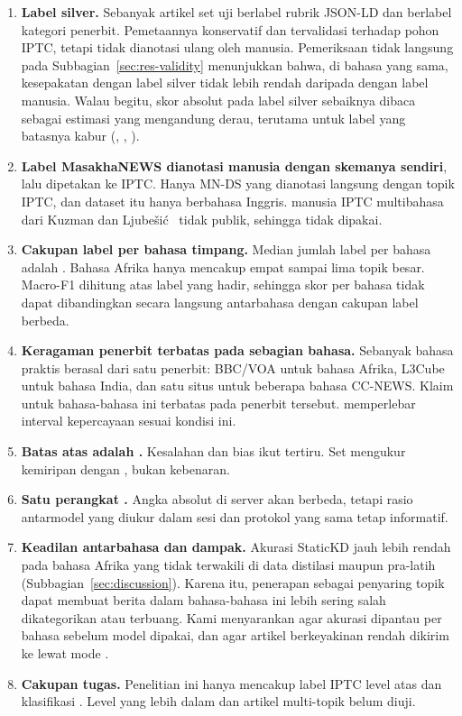 \begin{enumerate}
  \item \textbf{Label silver.} Sebanyak  artikel set uji berlabel rubrik JSON-LD dan  berlabel kategori penerbit. Pemetaannya konservatif dan tervalidasi terhadap pohon IPTC, tetapi tidak dianotasi ulang oleh manusia. Pemeriksaan tidak langsung pada Subbagian~\ref{sec:res-validity} menunjukkan bahwa, di bahasa yang sama, kesepakatan  dengan label silver tidak lebih rendah daripada dengan label manusia. Walau begitu, skor absolut pada label silver sebaiknya dibaca sebagai estimasi yang mengandung derau, terutama untuk label yang batasnya kabur (, , ).
  \item \textbf{Label MasakhaNEWS dianotasi manusia dengan skemanya sendiri}, lalu dipetakan ke IPTC. Hanya MN-DS yang dianotasi langsung dengan topik IPTC, dan dataset itu hanya berbahasa Inggris.  manusia IPTC multibahasa dari Kuzman dan Ljube\v{s}i\'c~\cite{kuzman2025llm} tidak publik, sehingga tidak dipakai.
  \item \textbf{Cakupan label per bahasa timpang.} Median jumlah label per bahasa adalah . Bahasa Afrika hanya mencakup empat sampai lima topik besar. Macro-F1 dihitung atas label yang hadir, sehingga skor per bahasa tidak dapat dibandingkan secara langsung antarbahasa dengan cakupan label berbeda.
  \item \textbf{Keragaman penerbit terbatas pada sebagian bahasa.} Sebanyak  bahasa praktis berasal dari satu penerbit: BBC/VOA untuk bahasa Afrika, L3Cube untuk bahasa India, dan satu situs untuk beberapa bahasa CC-NEWS. Klaim untuk bahasa-bahasa ini terbatas pada penerbit tersebut.  memperlebar interval kepercayaan sesuai kondisi ini.
  \item \textbf{Batas atas  adalah .} Kesalahan dan bias  ikut tertiru. Set  mengukur kemiripan dengan , bukan kebenaran.
  \item \textbf{Satu perangkat .} Angka absolut di server akan berbeda, tetapi rasio antarmodel yang diukur dalam sesi dan protokol yang sama tetap informatif.
  \item \textbf{Keadilan antarbahasa dan dampak.} Akurasi StaticKD jauh lebih rendah pada bahasa Afrika yang tidak terwakili di data distilasi maupun pra-latih (Subbagian~\ref{sec:discussion}). Karena itu, penerapan sebagai penyaring topik dapat membuat berita dalam bahasa-bahasa ini lebih sering salah dikategorikan atau terbuang. Kami menyarankan agar akurasi dipantau per bahasa sebelum model dipakai, dan agar artikel berkeyakinan rendah dikirim ke  lewat mode .
  \item \textbf{Cakupan tugas.} Penelitian ini hanya mencakup label IPTC level atas dan klasifikasi . Level yang lebih dalam dan artikel multi-topik belum diuji.
\end{enumerate}
